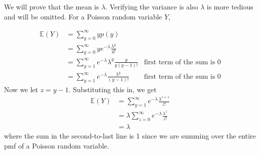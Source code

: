 \documentclass[12pt]{article}
\theoremstyle{definition}
\theoremstyle{remark}
\def\E{{\mathbb E}}
\begin{document}
We will prove that the mean is $\lambda$. Verifying the variance is also $\lambda$ is more tedious and will be omitted. For a Poisson random variable $Y$,

\begin{align*}
\E(Y) &= \sum_{y=0}^\infty y p(y) \\
&= \sum_{y=0}^\infty y e^{-\lambda}\frac{\lambda^y}{y!} \\
&= \sum_{y=1}^\infty e^{-\lambda}\lambda^y\frac{y}{y(y-1)!} & \text{first term of the sum is 0} \\
&= \sum_{y=1}^\infty e^{-\lambda} \frac{\lambda^y}{(y-1)!} & \text{first term of the sum is 0}
\end{align*}
Now we let $z = y - 1$. Substituting this in, we get
\begin{align*}
\E(Y) &= \sum_{y=1}^\infty e^{-\lambda} \frac{\lambda^{z+1}}{z!}\\
&= \lambda \sum_{z=0}^\infty e^{-\lambda} \frac{\lambda^{z}}{z!}\\
&= \lambda
\end{align*}
where the sum in the second-to-last line is 1 since we are summing over the entire pmf of a Poisson random variable.
\end{document}
